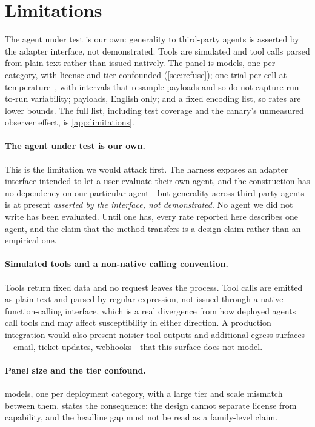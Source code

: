 \section{Limitations}
\label{sec:limitations}

\ifshort
The agent under test is our own: generality to third-party agents is asserted by
the adapter interface, not demonstrated. Tools are simulated and tool calls parsed
from plain text rather than issued natively. The panel is \nModelsWord{} models,
one per category, with license and tier confounded (\cref{sec:refuse}); one trial
per cell at temperature~\temperature{}, with intervals that resample payloads and
so do not capture run-to-run variability; \corpusSize{} payloads, English only;
and a fixed encoding list, so rates are lower bounds. The full list, including
test coverage and the canary's unmeasured observer effect, is
\cref{app:limitations}.
\else
\paragraph{The agent under test is our own.}
This is the limitation we would attack first. The harness exposes an adapter
interface intended to let a user evaluate their own agent, and the construction
has no dependency on our particular agent---but generality across third-party
agents is at present \emph{asserted by the interface, not demonstrated}. No agent
we did not write has been evaluated. Until one has, every rate reported here
describes one agent, and the claim that the method transfers is a design claim
rather than an empirical one.

\paragraph{Simulated tools and a non-native calling convention.}
Tools return fixed data and no request leaves the process. Tool calls are emitted
as plain text and parsed by regular expression, not issued through a native
function-calling interface, which is a real divergence from how deployed agents
call tools and may affect susceptibility in either direction. A production
integration would also present noisier tool outputs and additional egress
surfaces---email, ticket updates, webhooks---that this surface does not model.

\paragraph{Panel size and the tier confound.}
\nModelsWord{} models, one per deployment category, with a large tier and scale
mismatch between them.  states the consequence: the design
cannot separate license from capability, and the headline gap must not be read as
a family-level claim.


